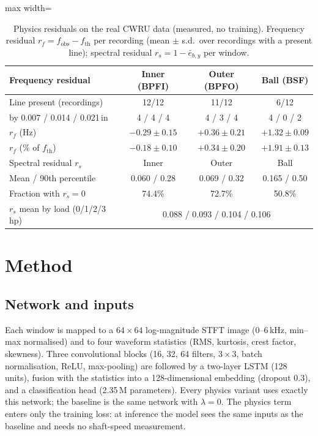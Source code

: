 \documentclass[conference]{IEEEtran}
\begin{document}
\begin{table}[t]
\caption{Physics residuals on the real CWRU data (measured, no training).
Frequency residual $r_f=f_{\mathrm{obs}}-f_{\mathrm{th}}$ per recording (mean
$\pm$ s.d.\ over recordings with a present line); spectral residual
$r_s=1-\bar e_{b,y}$ per window.}
\label{tab:residuals}
\centering
\footnotesize
\begin{adjustbox}{max width=\columnwidth}
\begin{tabular}{lccc}
\toprule
Frequency residual & Inner (BPFI) & Outer (BPFO) & Ball (BSF) \\
\midrule
Line present (recordings) & 12/12 & 11/12 & 6/12 \\
\quad by 0.007 / 0.014 / 0.021\,in & 4 / 4 / 4 & 4 / 3 / 4 & 4 / 0 / 2 \\
$r_f$ (Hz) & $-0.29\pm0.15$ & $+0.36\pm0.21$ & $+1.32\pm0.09$ \\
$r_f$ (\% of $f_{\mathrm{th}}$) & $-0.18\pm0.10$ & $+0.34\pm0.20$ & $+1.91\pm0.13$ \\
\midrule
Spectral residual $r_s$ & Inner & Outer & Ball \\
\midrule
Mean / 90th percentile & 0.060 / 0.28 & 0.069 / 0.32 & 0.165 / 0.50 \\
Fraction with $r_s=0$ & 74.4\% & 72.7\% & 50.8\% \\
\midrule
$r_s$ mean by load (0/1/2/3\,hp) & \multicolumn{3}{c}{0.088 / 0.093 / 0.104 / 0.106} \\
\bottomrule
\end{tabular}
\end{adjustbox}
\end{table}

\section{Method}
\label{sec:method}
\subsection{Network and inputs}
Each window is mapped to a $64\times64$ log-magnitude STFT image (0--6\,kHz,
min--max normalised) and to four waveform statistics (RMS, kurtosis, crest
factor, skewness). Three convolutional blocks (16, 32, 64 filters, $3\times3$,
batch normalisation, ReLU, max-pooling) are followed by a two-layer LSTM (128
units), fusion with the statistics into a 128-dimensional embedding (dropout
0.3), and a classification head (2.35\,M parameters). Every physics variant
uses exactly this network; the baseline is the same network with $\lambda=0$.
The physics term enters only the training loss: at inference the model sees
the same inputs as the baseline and needs no shaft-speed measurement.
\end{document}
